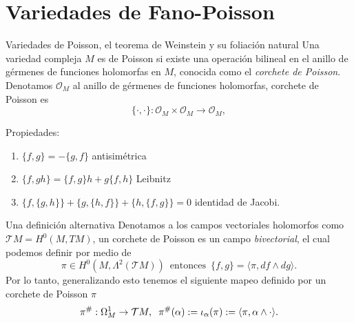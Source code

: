 \documentclass[letterpaper]{beamer}
\begin{document}
\section{Variedades de Fano-Poisson}
\begin{frame}
  \begin{block}{Variedades de Poisson, el teorema de Weinstein y su foliaci\'on natural}
        Una variedad compleja $M$ es de Poisson si existe una operaci\'on bilineal en el anillo de g\'ermenes de
        funciones holomorfas en $M$, conocida como el \emph{corchete de Poisson}.
        Denotamos $\mathcal{O}_M$ al anillo de g\'ermenes de funciones holomorfas, corchete de
        Poisson es
        \[
          \{\cdot,\cdot\}:\mathcal{O}_M\times\mathcal{O}_M\rightarrow\mathcal{O}_M,
        \]
    \end{block}
    Propiedades:
        \begin{enumerate}
            \item $\{f,g\} = -\{g,f\}$ antisim\'etrica
            \item $\{f,gh\}=\{f,g\}h + g\{f,h\}$ Leibnitz
            \item $\{f,\{g,h\}\}+\{g,\{h,f\}\} + \{h,\{ f,g\}\}=0$ identidad de Jacobi.
        \end{enumerate}
\end{frame}
\begin{frame}
      \begin{block}{Una definici\'on alternativa}
        Denotamos a los campos vectoriales holomorfos como $\mathcal{T}M=H^0(M,TM)$,
        un corchete de Poisson es un campo \emph{bivectorial}, el cual podemos definir por medio de
        \[
                \pi\in H^0(M,\Lambda^2(\mathcal{T}M))\,\text{ entonces }\,\{f,g\}=\langle \pi,df\wedge dg\rangle.
        \]
        Por lo tanto, generalizando esto tenemos el siguiente mapeo definido por un corchete de Poisson $\pi$
        \[
                \pi^{\#}:\Omega^1_M\rightarrow\mathcal{T}M,\hspace{0.2cm}\pi^{\#}(\alpha):=\iota_{\alpha}(\pi):=\langle\pi,\alpha\wedge\cdot\rangle.
        \]
    \end{block}
\end{frame}
\end{document}
